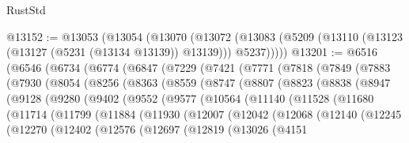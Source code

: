 \begin{lexlean}{RustStd}
\begin{coremodule}
@13152 := @13053
    (@13054
      (@13070
        (@13072 (@13083 (@5209 (@13110 (@13123 (@13127 (@5231 (@13134 @13139)) @13139))) @5237)))))
@13201 := @6516
    (@6546
      (@6734
        (@6774
          (@6847
            (@7229
              (@7421
                (@7771
                  (@7818
                    (@7849
                      (@7883
                        (@7930
                          (@8054
                            (@8256
                              (@8363
                                (@8559
                                  (@8747
                                    (@8807
                                      (@8823
                                        (@8838
                                          (@8947
                                            (@9128
                                              (@9280
                                                (@9402
                                                  (@9552
                                                    (@9577
                                                      (@10564
                                                        (@11140
                                                          (@11528
                                                            (@11680
                                                              (@11714
                                                                (@11799
                                                                  (@11884
                                                                    (@11930
                                                                      (@12007
                                                                        (@12042
                                                                          (@12068
                                                                            (@12140
                                                                              (@12245
                                                                                (@12270
                                                                                  (@12402
                                                                                    (@12576
                                                                                      (@12697
                                                                                        (@12819
                                                                                          (@13026
                                                                                            (@4151

\end{coremodule}
\end{lexlean}
